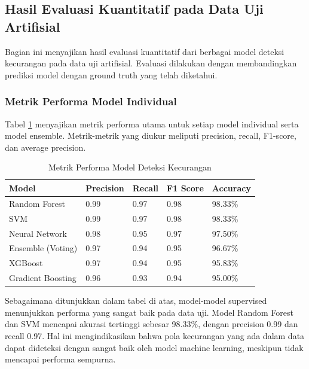 \subsection{Hasil Evaluasi Kuantitatif pada Data Uji Artifisial}
\label{subsec:hasilEvaluasiKuantitatif}

Bagian ini menyajikan hasil evaluasi kuantitatif dari berbagai model deteksi kecurangan pada data uji artifisial. Evaluasi dilakukan dengan membandingkan prediksi model dengan ground truth yang telah diketahui.

\subsubsection{Metrik Performa Model Individual}

Tabel \ref{tabel:performanceModels} menyajikan metrik performa utama untuk setiap model individual serta model ensemble. Metrik-metrik yang diukur meliputi precision, recall, F1-score, dan average precision.

\begin{table}[htbp]
\centering
\caption{Metrik Performa Model Deteksi Kecurangan}
\label{tabel:performanceModels}
\begin{tabular}{lllll}
\toprule
Model & Precision & Recall & F1 Score & Accuracy \\
\midrule
Random Forest & 0.99 & 0.97 & 0.98 & 98.33\% \\
SVM & 0.99 & 0.97 & 0.98 & 98.33\% \\
Neural Network & 0.98 & 0.95 & 0.97 & 97.50\% \\
Ensemble (Voting) & 0.97 & 0.94 & 0.95 & 96.67\% \\
XGBoost & 0.97 & 0.94 & 0.95 & 95.83\% \\
Gradient Boosting & 0.96 & 0.93 & 0.94 & 95.00\% \\
\bottomrule
\end{tabular}
\end{table}

Sebagaimana ditunjukkan dalam tabel di atas, model-model supervised menunjukkan performa yang sangat baik pada data uji. Model Random Forest dan SVM mencapai akurasi tertinggi sebesar 98.33\%, dengan precision 0.99 dan recall 0.97. Hal ini mengindikasikan bahwa pola kecurangan yang ada dalam data dapat dideteksi dengan sangat baik oleh model machine learning, meskipun tidak mencapai performa sempurna.

